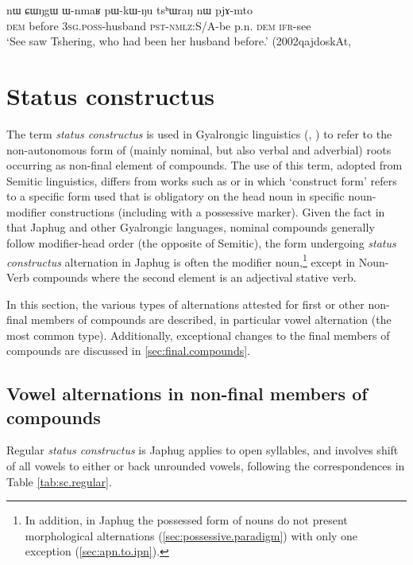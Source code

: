 \begin{exe}
\ex \label{ex:WnmaR.pWkWNu}
\gll nɯ ɕɯŋgɯ ɯ-nmaʁ pɯ-kɯ-ŋu tsʰɯraŋ nɯ pjɤ-mto  \\
\textsc{dem} before \textsc{3sg}.\textsc{poss}-husband \textsc{pst}-\textsc{nmlz}:S/A-be p.n. \textsc{dem} \textsc{ifr}-see \\
\glt `See saw Tshering, who had been her husband before.' (2002qajdoskAt, 
\end{exe}

\section{Status constructus} \label{sec:status.constructus}
The term \textit{status constructus} is used in Gyalrongic linguistics (\citealt{jacques12incorp}, \citealt[163-4]{lai17khroskyabs}) to refer to the non-autonomous form of (mainly nominal, but also verbal and adverbial) roots occurring as non-final element of compounds. The use of this term, adopted from Semitic linguistics,  differs from works such as \citet{creissels06hongrois} or \citet{creissels17construct} in which `construct form' refers to a specific form used that is obligatory on the head noun in specific noun-modifier constructions (including with a possessive marker). Given the fact in that Japhug and other Gyalrongic languages, nominal compounds generally follow modifier-head order (the opposite of Semitic), the form undergoing \textit{status constructus} alternation in Japhug is often the modifier noun,\footnote{In addition, in Japhug the possessed form of nouns do not present morphological alternations (\ref{sec:possessive.paradigm}) with only one exception (\ref{sec:apn.to.ipn}).} except in Noun-Verb compounds where the second element is an adjectival stative verb.

In this section, the various types of alternations attested for first or other non-final members of compounds are described, in particular vowel alternation (the most common type). Additionally, exceptional changes to the final members of compounds are discussed in \ref{sec:final.compounds}.

\subsection{Vowel alternations in non-final members of compounds} \label{sec:vowel.alternations.compounds}
Regular \textit{status constructus} is Japhug applies to open syllables, and involves shift of all vowels to either  or  back unrounded vowels, following the correspondences in Table \ref{tab:sc.regular}.


